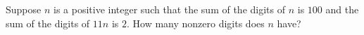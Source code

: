 Suppose $n$ is a positive integer such that the sum of the digits of $n$ is $100$ and the sum of the digits of $11n$ is $2$. How many nonzero digits does $n$ have?
